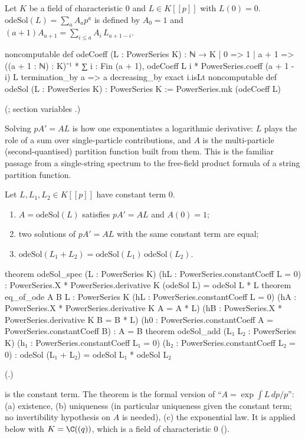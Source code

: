 \begin{definition}[Solution of $pA'=AL$]\label{ch19:def:ode}
Let $K$ be a field of characteristic $0$ and $L\in K[[p]]$ with $L(0)=0$.  $\mathrm{odeSol}(L)=\sum_aA_ap^a$ is defined by
$A_0=1$ and $(a+1)A_{a+1}=\sum_{i\le a}A_i\,L_{a+1-i}$.
\end{definition}
\begin{leancode}
noncomputable def odeCoeff (L : PowerSeries K) : ℕ → K
  | 0 => 1
  | a + 1 => ((a + 1 : ℕ) : K)⁻¹ *
      ∑ i : Fin (a + 1), odeCoeff L i * PowerSeries.coeff (a + 1 - i) L
termination_by a => a
decreasing_by exact i.isLt
noncomputable def odeSol (L : PowerSeries K) : PowerSeries K := PowerSeries.mk (odeCoeff L)
\end{leancode}
(; section variables .)

\begin{physics}
Solving $pA'=AL$ is how one exponentiates a logarithmic derivative: $L$ plays the role of a sum over single-particle
contributions, and $A$ is the multi-particle (second-quantised) partition function built from them. This is the
familiar passage from a single-string spectrum to the free-field product formula of a string partition function.
\end{physics}

\begin{theorem}\label{ch19:thm:ode}
Let $L,L_1,L_2\in K[[p]]$ have constant term $0$.
\begin{enumerate}[label=(\alph*)]
\item $A=\mathrm{odeSol}(L)$ satisfies $pA'=AL$ and $A(0)=1$;
\item two solutions of $pA'=AL$ with the same constant term are equal;
\item $\mathrm{odeSol}(L_1+L_2)=\mathrm{odeSol}(L_1)\,\mathrm{odeSol}(L_2)$.
\end{enumerate}
\end{theorem}
\begin{leancode}
theorem odeSol_spec (L : PowerSeries K) (hL : PowerSeries.constantCoeff L = 0) :
    PowerSeries.X * PowerSeries.derivative K (odeSol L) = odeSol L * L
theorem eq_of_ode {A B L : PowerSeries K} (hL : PowerSeries.constantCoeff L = 0)
    (hA : PowerSeries.X * PowerSeries.derivative K A = A * L)
    (hB : PowerSeries.X * PowerSeries.derivative K B = B * L)
    (h0 : PowerSeries.constantCoeff A = PowerSeries.constantCoeff B) : A = B
theorem odeSol_add (L₁ L₂ : PowerSeries K) (h₁ : PowerSeries.constantCoeff L₁ = 0)
    (h₂ : PowerSeries.constantCoeff L₂ = 0) :
    odeSol (L₁ + L₂) = odeSol L₁ * odeSol L₂
\end{leancode}
(.)
\begin{dictionary}
 is the constant term.  The theorem is the formal version of
``$A=\exp\int L\,dp/p$'': (a) existence, (b) uniqueness (in particular uniqueness given the constant term; no
invertibility hypothesis on $A$ is needed), (c) the exponential law.  It is applied below with $K=\C((q))$, which is a
field of characteristic $0$ ().
\end{dictionary}
